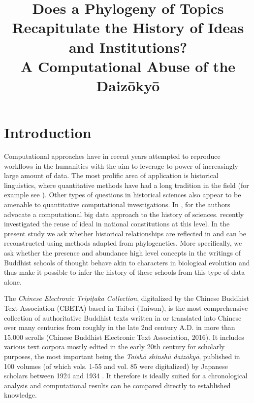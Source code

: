 \documentclass[a4paper,10pt]{article}
\title{Does a Phylogeny of Topics Recapitulate the History of Ideas and 
  Institutions? \\
  A Computational Abuse of the Daiz{\=o}ky{\=o}}
\date{}
\begin{document}
\maketitleabstract

\section{Introduction}

Computational approaches have in recent years attempted to reproduce
workflows in the humanities with the aim to leverage to power of
increasingly large amount of data. The most prolific area of application is
historical linguistics, where quantitative methods have had a long
tradition in the field (for example see 
\cite{levinson_tools_2012,gray_language-tree_2003,croft2008evolutionary}). 
Other types of questions in historical sciences also appear to be
amenable to quantitative computational investigations. In
\cite{Laubichler:13}, for the authors advocate a computational big data
approach to the history of sciences. \cite{Rockmore:16} recently
investigated the reuse of ideal in national constitutions at this level. In
the present study we ask whether historical relationships are reflected in
and can be reconstructed using methods adapted from phylogenetics. More
specifically, we ask whether the presence and abundance high level concepts
in the writings of Buddhist schools of thought behave akin to characters in
biological evolution and thus make it possible to infer the history of
these schools from this type of data alone.

The \textit{Chinese Electronic Tripi{\d{t}}aka Collection}, digitalized by
the Chinese Buddhist Text Association (CBETA) based in Taibei (Taiwan), is
the most comprehensive collection of authoritative Buddhist texts written
in or translated into Chinese over many centuries from roughly in the late
2nd century A.D. in more than 15.000 scrolls (Chinese Buddhist Electronic
Text Association, 2016). It includes various text corpora mostly edited in
the early 20th century for scholarly purposes, the most important being the
\emph{Taish{\=o} shinsh{\=u} daiz{\=o}ky{\=o}}, published in 100 volumes
(of which vols. 1-55 and vol. 85 were digitalized) by Japanese scholars
between 1924 and 1934 \cite{Juniro:24-34}. It therefore is ideally suited
for a chronological analysis and computational results can be compared
directly to established knowledge.
\end{document}
